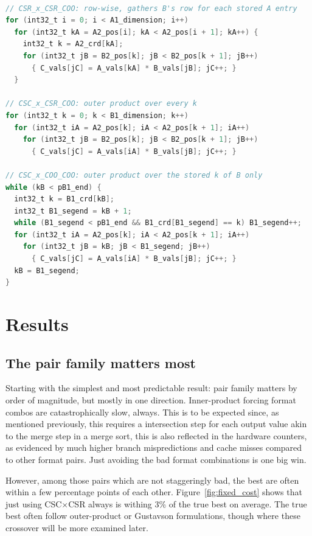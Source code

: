 \begin{lstlisting}[language=C, caption={Compute loops of the generated kernels, declarations omitted.}, label={lst:kernels}]

// CSR_x_CSR_COO: row-wise, gathers B's row for each stored A entry
for (int32_t i = 0; i < A1_dimension; i++)
  for (int32_t kA = A2_pos[i]; kA < A2_pos[i + 1]; kA++) {
    int32_t k = A2_crd[kA];
    for (int32_t jB = B2_pos[k]; jB < B2_pos[k + 1]; jB++)
      { C_vals[jC] = A_vals[kA] * B_vals[jB]; jC++; }
  }

// CSC_x_CSR_COO: outer product over every k
for (int32_t k = 0; k < B1_dimension; k++)
  for (int32_t iA = A2_pos[k]; iA < A2_pos[k + 1]; iA++)
    for (int32_t jB = B2_pos[k]; jB < B2_pos[k + 1]; jB++)
      { C_vals[jC] = A_vals[iA] * B_vals[jB]; jC++; }

// CSC_x_COO_COO: outer product over the stored k of B only
while (kB < pB1_end) {
  int32_t k = B1_crd[kB];
  int32_t B1_segend = kB + 1;
  while (B1_segend < pB1_end && B1_crd[B1_segend] == k) B1_segend++;
  for (int32_t iA = A2_pos[k]; iA < A2_pos[k + 1]; iA++)
    for (int32_t jB = kB; jB < B1_segend; jB++)
      { C_vals[jC] = A_vals[iA] * B_vals[jB]; jC++; }
  kB = B1_segend;
}
\end{lstlisting}

\section{Results}

\subsection{The pair family matters most}

Starting with the simplest and most predictable result: pair family matters by order of magnitude, but mostly in one direction. Inner-product forcing format combos
are catastrophically slow, always. This is to be expected since, as mentioned previously, this requires a intersection step for each output value akin to the merge
step in a merge sort, this is also reflected in the hardware counters, as evidenced by much higher branch mispredictions and cache misses compared to
other format pairs. Just avoiding the bad format combinations is one big win.

However, among those pairs which are not staggeringly bad, the best are often within
a few percentage points of each other. Figure~\ref{fig:fixed_cost} shows that just using CSC$\times$CSR always is withing 3\% of the true best on average. The true best often follow outer-product or Gustavson formulations, though where these crossover will be more examined later.

